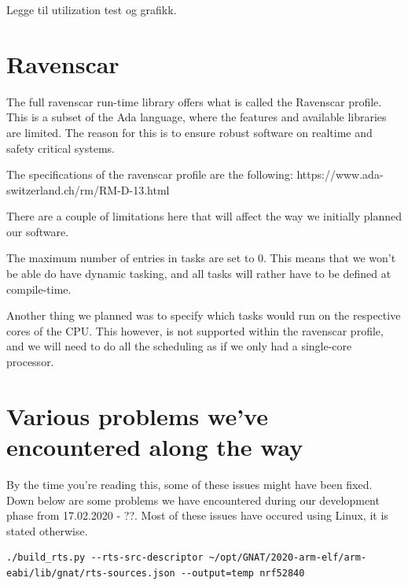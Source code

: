 \documentclass{article}
\begin{document}
Legge til utilization test og grafikk.

\section{Ravenscar}

The full ravenscar run-time library offers what is called the Ravenscar profile. This is a subset of the Ada language, where the features and available libraries are limited. The reason for this is to ensure robust software on realtime and safety critical systems. 

The specifications of the ravenscar profile are the following:
https://www.ada-switzerland.ch/rm/RM-D-13.html

There are a couple of limitations here that will affect the way we initially planned our software. 

The maximum number of entries in tasks are set to 0. This means that we won't be able do have dynamic tasking, and all tasks will rather have to be defined at compile-time. 

Another thing we planned was to specify which tasks would run on the respective cores of the CPU. This however, is not supported within the ravenscar profile, and we will need to do all the scheduling as if we only had a single-core processor. 

\section{Various problems we've encountered along the way}

By the time you're reading this, some of these issues might have been fixed. Down below are some problems we have encountered during our development phase from 17.02.2020 - ??. Most of these issues have occured using Linux, it is stated otherwise.
\begin{lstlisting}
./build_rts.py --rts-src-descriptor ~/opt/GNAT/2020-arm-elf/arm-eabi/lib/gnat/rts-sources.json --output=temp nrf52840
\end{lstlisting}
\end{document}
